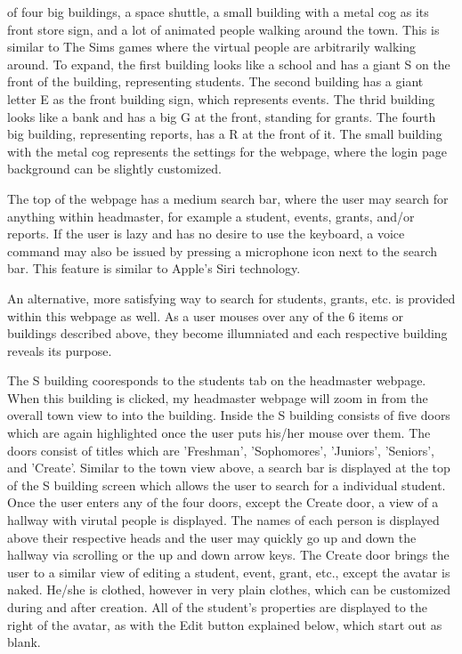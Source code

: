 \documentclass[11pt]{article}
\begin{document}
 of four big buildings, a space shuttle, a small building with a metal cog as its front store sign, and a lot of animated people walking around the town. This is similar to The Sims games where the virtual people are arbitrarily walking around. To expand, the first building looks like a school and has a giant S on the front of the building, representing students. The second building has a giant letter E as the front building sign, which represents events. The thrid building looks like a bank and has a big G at the front, standing for grants. The fourth big building, representing reports, has a R at the front of it. The small building with the metal cog represents the settings for the webpage, where the login page background can be slightly customized.

 The top of the webpage has a medium search bar, where the user may search for anything within headmaster, for example a student, events, grants, and/or reports. If the user is lazy and has no desire to use the keyboard, a voice command may also be issued by pressing a microphone icon next to the search bar. This feature is similar to Apple's Siri technology. 

An alternative, more satisfying way to search for students, grants, etc. is provided within this webpage as well. As a user mouses over any of the 6 items or buildings described above, they become illumniated and each respective building reveals its purpose. 

The S building cooresponds to the students tab on the headmaster webpage. When this building is clicked, my headmaster webpage will zoom in from the overall town view to into the building. Inside the S building consists of five doors which are again highlighted once the user puts his/her mouse over them. The doors consist of titles which are 'Freshman', 'Sophomores', 'Juniors', 'Seniors', and 'Create'. Similar to the town view above, a search bar is displayed at the top of the S building screen which allows the user to search for a individual student. Once the user enters any of the four doors, except the Create door, a view of a hallway with virutal people is displayed. The names of each person is displayed above their respective heads and the user may quickly go up and down the hallway via scrolling or the up and down arrow keys. The Create door brings the user to a similar view of editing a student, event, grant, etc., except the avatar is naked. He/she is clothed, however in very plain clothes, which can be customized during and after creation. All of the student's properties are displayed to the right of the avatar, as with the Edit button explained below, which start out as blank.
\end{document}
